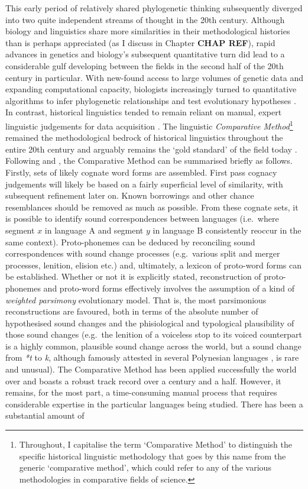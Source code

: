 This early period of relatively shared phylogenetic thinking subsequently diverged into two quite independent streams of thought in the 20th century. Although biology and linguistics share more similarities in their methodological histories than is perhaps appreciated (as I discuss in Chapter \textbf{CHAP REF}), rapid advances in genetics and biology's subsequent quantitative turn did lead to a considerable gulf developing between the fields in the second half of the 20th century in particular. With new-found access to large volumes of genetic data and expanding computational capacity, biologists increasingly turned to quantitative algorithms to infer phylogenetic relationships and test evolutionary hypotheses \autocite{atkinson_curious_2005}. In contrast, historical linguistics tended to remain reliant on manual, expert linguistic judgements for data acquisition \autocite{nunn_comparative_2011}. The linguistic \emph{Comparative Method}\footnote{Throughout, I capitalise the term `Comparative Method' to distinguish the specific historical linguistic methodology that goes by this name from the generic `comparative method', which could refer to any of the various methodologies in comparative fields of science.} remained the methodological bedrock of historical linguistics throughout the entire 20th century and arguably remains the `gold standard' of the field today \autocites{chang_ancestry-constrained_2015}{bouckaert_origin_2018}{kolipakam_bayesian_2018}. Following \textcite{thomason_language_1988} and \textcite{campbell_historical_2004}, the Comparative Method can be summarised briefly as follows. Firstly, sets of likely cognate word forms are assembled. First pass cognacy judgements will likely be based on a fairly superficial level of similarity, with subsequent refinement later on. Known borrowings and other chance resemblances should be removed as much as possible. From these cognate sets, it is possible to identify sound correspondences between languages (i.e.~where segment \(x\) in language A and segment \(y\) in language B consistently reoccur in the same context). Proto-phonemes can be deduced by reconciling sound correspondences with sound change processes (e.g.~various split and merger processes, lenition, elision etc.) and, ultimately, a lexicon of proto-word forms can be established. Whether or not it is explicitly stated, reconstruction of proto-phonemes and proto-word forms effectively involves the assumption of a kind of \emph{weighted parsimony} evolutionary model. That is, the most parsimonious reconstructions are favoured, both in terms of the absolute number of hypothesised sound changes and the phisiological and typological plausibility of those sound changes (e.g.~the lenition of a voiceless stop to its voiced counterpart is a highly common, plausible sound change across the world, but a sound change from \emph{*t} to \emph{k}, although famously attested in several Polynesian languages \autocite{blust_t_2004}, is rare and unusual). The Comparative Method has been applied successfully the world over and boasts a robust track record over a century and a half. However, it remains, for the most part, a time-consuming manual process that requires considerable expertise in the particular languages being studied. There has been a substantial amount of 